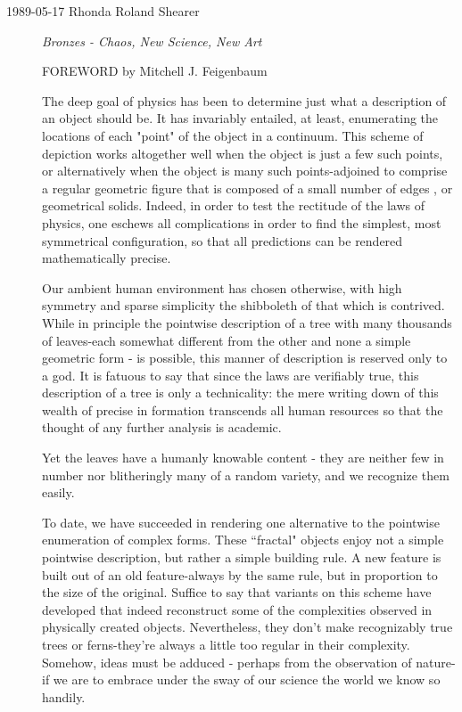 \begin{description}

\item[1989-05-17 Rhonda Roland Shearer]
{\em Bronzes - Chaos, New Science, New Art}

FOREWORD
by Mitchell J. Feigenbaum

The deep goal of physics has been to determine just what a description of
an object should be. It has invariably entailed, at least, enumerating
the locations of each "point" of the object in a continuum. This scheme
of depiction works altogether well when the object is just a few such
points, or alternatively when the object is many such points-adjoined to
comprise a regular geometric figure that is composed of a small number of
edges , or geometrical solids. Indeed, in order to test the rectitude of
the laws of physics, one eschews all complications in order to find the
simplest, most symmetrical configuration, so that all predictions can be
rendered mathematically precise.

Our ambient human environment has chosen otherwise, with high symmetry
and sparse simplicity the shibboleth of that which is contrived. While in
principle the pointwise description of a tree with many thousands of
leaves-each somewhat different from the other and none a simple geometric
form - is possible, this manner of description is reserved only to a god.
It is fatuous to say that since the laws are verifiably true, this
description of a tree is only a technicality: the mere writing down of
this wealth of precise in formation transcends all human resources so
that the thought of any further analysis is academic.

Yet the leaves have a humanly knowable content - they are neither few in
number nor blitheringly many of a random variety, and we recognize them
easily.

To date, we have succeeded in rendering one alternative to
the pointwise enumeration of complex forms. These ``fractal" objects
enjoy not a simple pointwise description, but rather a simple building
rule. A new feature is built out of an old feature-always by the same
rule, but in proportion to the size of the original. Suffice to say that
variants on this scheme have developed that indeed reconstruct some of
the complexities observed in physically created objects. Nevertheless,
they don't make recognizably true trees or ferns-they're always a little
too regular in their complexity. Somehow, ideas must be adduced - perhaps
from the observation of nature-if we are to embrace under the sway of our
science the world we know so handily.


\end{description}
